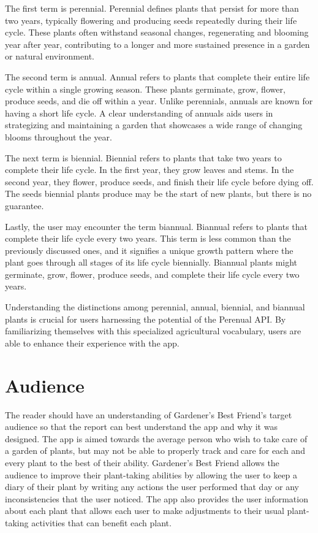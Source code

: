 \documentclass{sigchi}
\begin{document}
The first term is perennial. Perennial defines plants that persist for more than two years, typically flowering and producing seeds repeatedly during their life cycle. These plants often withstand seasonal changes, regenerating and blooming year after year, contributing to a longer and more sustained presence in a garden or natural environment. 

 The second term is annual. Annual refers to plants that complete their entire life cycle within a single growing season. These plants germinate, grow, flower, produce seeds, and die off within a year. Unlike perennials, annuals are known for having a short life cycle. A clear understanding of annuals aids users in strategizing and maintaining a garden that showcases a wide range of changing blooms throughout the year.

The next term is biennial. Biennial refers to plants that take two years to complete their life cycle. In the first year, they grow leaves and stems. In the second year, they flower, produce seeds, and finish their life cycle before dying off. The seeds biennial plants produce may be the start of new plants, but there is no guarantee.

Lastly, the user may encounter the term biannual. Biannual refers to plants that complete their life cycle every two years. This term is less common than the previously discussed ones, and it signifies a unique growth pattern where the plant goes through all stages of its life cycle biennially. Biannual plants might germinate, grow, flower, produce seeds, and complete their life cycle every two years.

Understanding the distinctions among perennial, annual, biennial, and biannual plants is crucial for users harnessing the potential of the Perenual API. By familiarizing themselves with this specialized agricultural vocabulary, users are able to enhance their experience with the app.

\section{Audience}
The reader should have an understanding of Gardener's Best Friend's target audience so that the report can best understand the app and why it was designed. The app is aimed towards the average person who wish to take care of a garden of plants, but may not be able to properly track and care for each and every plant to the best of their ability. Gardener's Best Friend allows the audience to improve their plant-taking abilities by allowing the user to keep a diary of their plant by writing any actions the user performed that day or any inconsistencies that the user noticed. The app also provides the user information about each plant that allows each user to make adjustments to their usual plant-taking activities that can benefit each plant.
\end{document}
